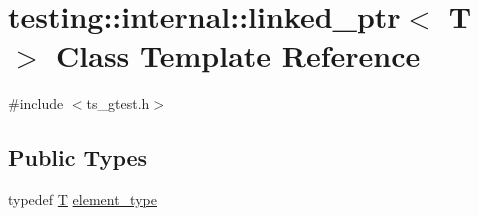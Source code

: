 \hypertarget{classtesting_1_1internal_1_1linked__ptr}{\section{testing\-:\-:internal\-:\-:linked\-\_\-ptr$<$ T $>$ Class Template Reference}
\label{classtesting_1_1internal_1_1linked__ptr}
}


{\ttfamily \#include $<$ts\-\_\-gtest.\-h$>$}

\subsection*{Public Types}
\begin{DoxyCompactItemize}
\item 
typedef \hyperlink{calib3d_8hpp_a3efb9551a871ddd0463079a808916717}{T} \hyperlink{classtesting_1_1internal_1_1linked__ptr_a295c7d1ee4100d916514c4e4385a0063}{element\-\_\-type}
\end{DoxyCompactItemize}
